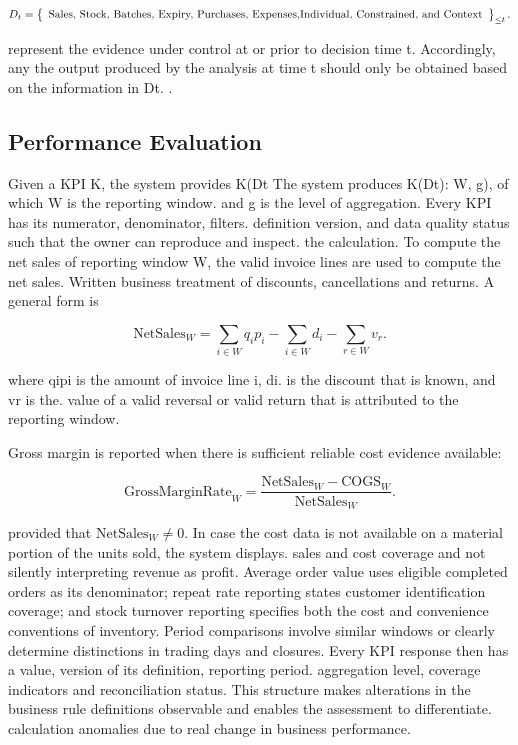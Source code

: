 \documentclass[a4paper,11pt,oneside]{book}
\theoremstyle{plain}
\theoremstyle{definition}
\theoremstyle{remark}
\let\\\space
\begin{document}
\begin{equation}
D_t=\left\{\begin{array}{c}
\text{Sales, Stock, Batches, Expiry, Purchases, Expenses,}\\
\text{Individual, Constrained, and Context}
\end{array}\right\}_{\leq t}.
\label{eq:data_cutoff}
\end{equation}

represent the evidence under control at or prior to decision time t. Accordingly, any the output produced by the analysis at time t should only be obtained based on the information in Dt. .

\subsection{Performance Evaluation}
\label{subsec:performance_evaluation}

Given a KPI K, the system provides K(Dt The system produces K(Dt): W, g), of which W is the reporting window. and g is the level of aggregation. Every KPI has its numerator, denominator, filters. definition version, and data quality status such that the owner can reproduce and inspect. the calculation. To compute the net sales of reporting window W, the valid invoice lines are used to compute the net sales. Written business treatment of discounts, cancellations and returns. A general form is

\begin{equation}
\mathrm{NetSales}_{W}=\sum_{i\in W}q_i p_i-\sum_{i\in W}d_i-\sum_{r\in W}v_r.
\label{eq:netsales}
\end{equation}

where qipi is the amount of invoice line i, di. is the discount that is known, and vr is the. value of a valid reversal or valid return that is attributed to the reporting window.

Gross margin is reported when there is sufficient reliable cost evidence available:

\begin{equation}
\mathrm{GrossMarginRate}_{W}=\frac{\mathrm{NetSales}_{W}-\mathrm{COGS}_{W}}{\mathrm{NetSales}_{W}}.
\label{eq:grossmargin}
\end{equation}

provided that \(\mathrm{NetSales}_{W}\neq 0\). In case the cost data is not available on a material portion of the units sold, the system displays. sales and cost coverage and not silently interpreting revenue as profit. Average order value uses eligible completed orders as its denominator; repeat rate reporting states customer identification coverage; and stock turnover reporting specifies both the cost and convenience conventions of inventory. Period comparisons involve similar windows or clearly determine distinctions in trading days and closures. Every KPI response then has a value, version of its definition, reporting period. aggregation level, coverage indicators and reconciliation status. This structure makes alterations in the business rule definitions observable and enables the assessment to differentiate. calculation anomalies due to real change in business performance.
\end{document}
